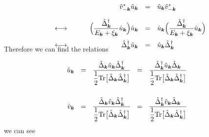 \documentclass[uplatex,a4j,12pt,dvipdfmx]{jsarticle}
\begin{document}
	\begin{eqnarray}
		\begin{array}{rcrcl}
			 &   &
			\hat{v}_{-\bm{k}}^{*} \hat{u}_{\bm{k}}
			 & = &
			\hat{u}_{\bm{k}} \hat{v}_{-\bm{k}}^{*}
			\nonumber \\[4mm] &\longleftrightarrow& \hspace{8mm}
			\Big( \dfrac{ \hat{\Delta}^{\dagger}_{\bm{k}} }{ E_{\bm{k}} + \xi_{\bm{k}} } \hat{u}_{\bm{k}} \Big)
			\hat{u}_{\bm{k}}
			 & = &
			\hat{u}_{\bm{k}}
			\Big( \dfrac{ \hat{\Delta}^{\dagger}_{\bm{k}} }{ E_{\bm{k}} + \xi_{\bm{k}} } \hat{u}_{\bm{k}} \Big)
			\nonumber \\[4mm] &\longleftrightarrow& \hspace{8mm}
			\hat{\Delta}^{\dagger}_{\bm{k}} \hat{u}_{\bm{k}}
			 & = &
			\hat{u}_{\bm{k}} \hat{\Delta}^{\dagger}_{\bm{k}}
		\end{array}
		\\[-5mm]
	\end{eqnarray}
	Therefore we can find the relations

	\begin{eqnarray}
		\hat{u}_{\bm{k}}
		\ \ = \ \
		\dfrac{ \hat{\Delta}_{\bm{k}} \hat{u}_{\bm{k}} \hat{\Delta}^{\dagger}_{\bm{k}} }{ \dfrac{1}{2} {\rm Tr} \big[ \hat{\Delta}_{\bm{k}} \hat{\Delta}^{\dagger}_{\bm{k}} \big] }
		\ \ = \ \
		\dfrac{ \hat{\Delta}^{\dagger}_{\bm{k}} \hat{u}_{\bm{k}} \hat{\Delta}_{\bm{k}} }{ \dfrac{1}{2} {\rm Tr} \big[ \hat{\Delta}_{\bm{k}} \hat{\Delta}^{\dagger}_{\bm{k}} \big] }
		\\[5mm]
		\hat{v}_{\bm{k}}
		\ \ = \ \
		\dfrac{ \hat{\Delta}_{\bm{k}} \hat{v}_{\bm{k}} \hat{\Delta}^{\dagger}_{\bm{k}} }{ \dfrac{1}{2} {\rm Tr} \big[ \hat{\Delta}_{\bm{k}} \hat{\Delta}^{\dagger}_{\bm{k}} \big] }
		\ \ = \ \
		\dfrac{ \hat{\Delta}^{\dagger}_{\bm{k}} \hat{v}_{\bm{k}} \hat{\Delta}_{\bm{k}} }{ \dfrac{1}{2} {\rm Tr} \big[ \hat{\Delta}_{\bm{k}} \hat{\Delta}^{\dagger}_{\bm{k}} \big] }
	\end{eqnarray}
	we can see
\end{document}
